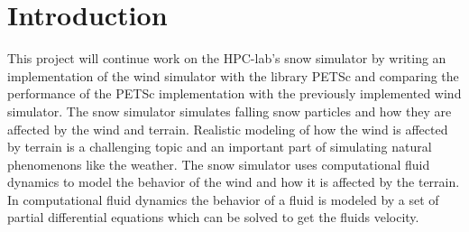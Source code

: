 \chapter{Introduction}

This project will continue work on the HPC-lab's snow simulator by writing an
implementation of the wind simulator with the library PETSc and comparing the
performance of the PETSc implementation with the previously implemented wind
simulator. The snow simulator simulates falling snow particles and how they are
affected by the wind and terrain. Realistic modeling of how the wind is affected
by terrain is a challenging topic and an important part of simulating natural
phenomenons like the weather. The snow simulator uses computational fluid dynamics
to model the behavior of the wind and how it is affected by the terrain.
In computational fluid dynamics the behavior of a fluid is modeled by a set of
partial differential equations which can be solved to get the fluids velocity.





